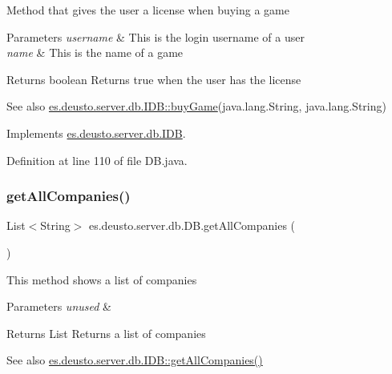 Method that gives the user a license when buying a game 
\begin{DoxyParams}{Parameters}
{\em username} & This is the login username of a user \\
\hline
{\em name} & This is the name of a game \\
\hline
\end{DoxyParams}
\begin{DoxyReturn}{Returns}
boolean Returns true when the user has the license 
\end{DoxyReturn}
\begin{DoxySeeAlso}{See also}
\hyperlink{interfacees_1_1deusto_1_1server_1_1db_1_1_i_d_b_ab1076d02bd6b4da29d0e99e1310048b6}{es.\+deusto.\+server.\+db.\+I\+D\+B\+::buy\+Game}(java.\+lang.\+String, java.\+lang.\+String) 
\end{DoxySeeAlso}


Implements \hyperlink{interfacees_1_1deusto_1_1server_1_1db_1_1_i_d_b_ab1076d02bd6b4da29d0e99e1310048b6}{es.\+deusto.\+server.\+db.\+I\+DB}.



Definition at line 110 of file D\+B.\+java.

\mbox{\label{classes_1_1deusto_1_1server_1_1db_1_1_d_b_a59802aeefdd9d445152fbd548a964708}} 
\subsubsection{\texorpdfstring{get\+All\+Companies()}{getAllCompanies()}}
{\footnotesize\ttfamily List$<$String$>$ es.\+deusto.\+server.\+db.\+D\+B.\+get\+All\+Companies (\begin{DoxyParamCaption}{ }\end{DoxyParamCaption})}

This method shows a list of companies 
\begin{DoxyParams}{Parameters}
{\em unused} & \\
\hline
\end{DoxyParams}
\begin{DoxyReturn}{Returns}
List Returns a list of companies 
\end{DoxyReturn}
\begin{DoxySeeAlso}{See also}
\hyperlink{interfacees_1_1deusto_1_1server_1_1db_1_1_i_d_b_af7500b1f7c74d658837ed1a5ec82ebec}{es.\+deusto.\+server.\+db.\+I\+D\+B\+::get\+All\+Companies()} 
\end{DoxySeeAlso}


